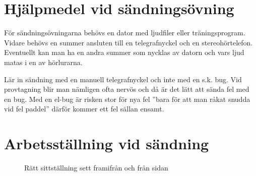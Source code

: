 \section[Övningshjälpmedel]{Hjälpmedel vid sändningsövning}

För sändningsövningarna behövs en dator med ljudfiler eller träningsprogram.
Vidare behövs en summer ansluten till en telegrafnyckel och en stereohörtelefon.
Eventuellt kan man ha en andra summer som nycklas av datorn och vars ljud matas
i en av hörlurarna.

Lär in sändning med en manuell telegrafnyckel och inte med en s.k. bug.
Vid provtagning blir man nämligen ofta nervös och då är det lätt att sända fel
med en bug.
Med en el-bug är risken stor för nya fel ''bara för att man råkat snudda vid fel
paddel'' därför kommer ett fel sällan ensamt.

\section[Ställning]{Arbetsställning vid sändning}

\begin{figure}
  \caption{Rätt sittställning sett framifrån och från sidan}
  \label{fig:bild_morse_3_4}
\end{figure}

